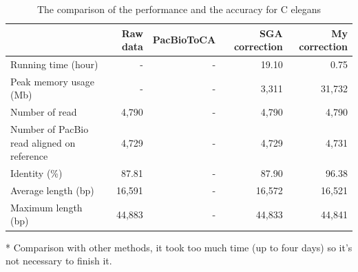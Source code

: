 
%

\begin{table}[htbp]  
\centering  
\begin{threeparttable}
\caption{The comparison of the performance and the accuracy for C elegans}  
{
\label{resultOfthirdDataset}
\scriptsize 
\setlength\tabcolsep{3pt} 
\begin{tabular}{@{}lrrrr@{}}
\toprule
\textbf{} & \textbf{Raw data} & \tnote{*} \textbf{PacBioToCA} & \textbf{SGA correction} & \textbf{My correction} \\ \midrule
Running time (hour) & - & - & 19.10 & 0.75 \\ 
Peak memory usage (Mb) & - & - & 3,311 & 31,732 \\ 
Number of read & 4,790 & - & 4,790 & 4,790 \\
Number of PacBio read aligned on reference & 4,729 & - & 4,729 & 4,731 \\ 
Identity (\%) & 87.81 & - & 87.90 & 96.38 \\
Average length (bp) & 16,591 & - & 16,572 & 16,521 \\
Maximum length (bp) & 44,883 & - & 44,833 & 44,841 \\ \bottomrule
\end{tabular}   
\begin{tablenotes}  
\item[*] Comparison with other methods, it took too much time (up to four days) so it's not necessary to finish it.
\end{tablenotes}  
}  
\end{threeparttable}  
\end{table}  

%